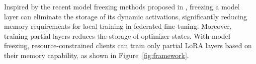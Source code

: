 \documentclass[lettersize,journal]{IEEEtran}
\begin{document}
Inspired by the recent model freezing methods proposed in \cite{su2023fedra,ardakani2024slimfit,pan2024lisa}, freezing a model layer can eliminate the storage of its dynamic activations, significantly reducing memory requirements for local training in federated fine-tuning. 
Moreover, training partial layers reduces the storage of optimizer states.
With model freezing, resource-constrained clients can train only partial LoRA layers based on their memory capability, as shown in Figure~\ref{fig:framework}. 






%

\end{document}

